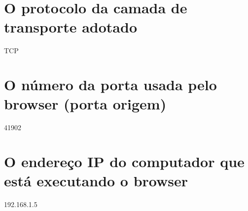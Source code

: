 \begin{parts}
    \part{O protocolo da camada de transporte adotado}
    \begin{solution}
    TCP
    \end{solution}

    \part{O número da porta usada pelo browser (porta origem)}
    \begin{solution}
    41902
    \end{solution}

    \part{O endereço IP do computador que está executando o browser}
    \begin{solution}
    192.168.1.5
    \end{solution}
\end{parts}
